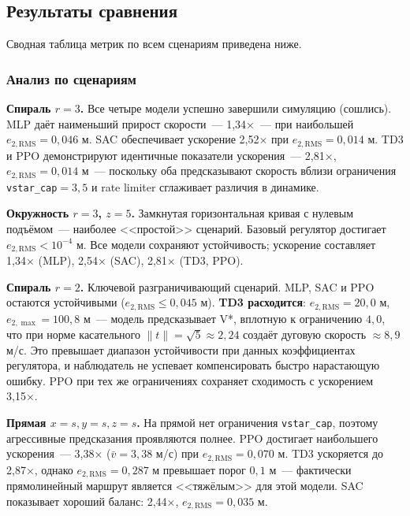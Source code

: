 \subsection{Результаты сравнения}

Сводная таблица метрик по всем сценариям приведена ниже.



\subsubsection*{Анализ по сценариям}

\textbf{Спираль $r{=}3$.}
Все четыре модели успешно завершили симуляцию (сошлись).
MLP даёт наименьший прирост скорости~--- 1{,}34×~--- при наибольшей $e_{2,\mathrm{RMS}} = 0{,}046$ м. SAC обеспечивает ускорение 2{,}52× при $e_{2,\mathrm{RMS}} = 0{,}014$ м. TD3 и PPO демонстрируют идентичные показатели ускорения~--- 2{,}81×, $e_{2,\mathrm{RMS}} = 0{,}014$ м~--- поскольку оба предсказывают скорость вблизи ограничения \texttt{vstar\_cap}$=3{,}5$ и rate limiter сглаживает различия в динамике.

\textbf{Окружность $r{=}3$, $z{=}5$.}
Замкнутая горизонтальная кривая с нулевым подъёмом~--- наиболее <<простой>> сценарий.
Базовый регулятор достигает $e_{2,\mathrm{RMS}} < 10^{-4}$ м.
Все модели сохраняют устойчивость; ускорение составляет 1{,}34× (MLP), 2{,}54× (SAC), 2{,}81× (TD3, PPO).

\textbf{Спираль $r{=}2$.}
Ключевой разграничивающий сценарий.
MLP, SAC и PPO остаются устойчивыми ($e_{2,\mathrm{RMS}} \leq 0{,}045$ м).
\textbf{TD3 расходится}: $e_{2,\mathrm{RMS}} = 20{,}0$ м, $e_{2,\max} = 100{,}8$ м~--- модель предсказывает V*, вплотную к ограничению $4{,}0$, что при норме касательного $\|t\| = \sqrt{5} \approx 2{,}24$ создаёт дуговую скорость $\approx 8{,}9$ м/с. Это превышает диапазон устойчивости при данных коэффициентах регулятора, и наблюдатель не успевает компенсировать быстро нарастающую ошибку.
PPO при тех же ограничениях сохраняет сходимость с ускорением 3{,}15×.

\textbf{Прямая $x{=}s,y{=}s,z{=}s$.}
На прямой нет ограничения \texttt{vstar\_cap}, поэтому агрессивные предсказания проявляются полнее.
PPO достигает наибольшего ускорения~--- 3{,}38× ($\bar{v} = 3{,}38$ м/с) при $e_{2,\mathrm{RMS}} = 0{,}070$ м.
TD3 ускоряется до 2{,}87×, однако $e_{2,\mathrm{RMS}} = 0{,}287$ м превышает порог $0{,}1$ м~--- фактически прямолинейный маршрут является <<тяжёлым>> для этой модели.
SAC показывает хороший баланс: 2{,}44×, $e_{2,\mathrm{RMS}} = 0{,}035$ м.


